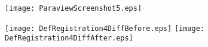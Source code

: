 \begin{figure}
\center
\texttt{[image: ParaviewScreenshot5.eps]}
\label{fig:ParaviewScreenshot5}
\end{figure}

\begin{figure}
\center
\texttt{[image: DefRegistration4DiffBefore.eps]}
\texttt{[image: DefRegistration4DiffAfter.eps]}
\label{fig:DefRegistrationDiffScreenshot}
\end{figure}


